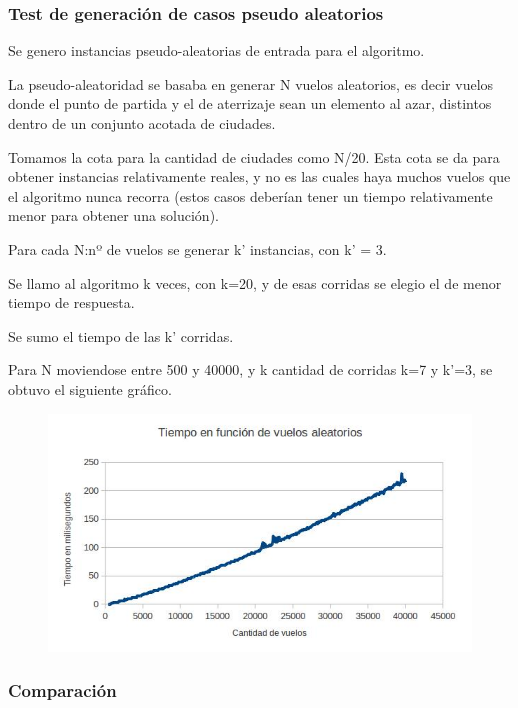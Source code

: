\subsubsection{Test de generaci\'on de casos pseudo aleatorios}

Se genero instancias pseudo-aleatorias de entrada para el algoritmo.

La pseudo-aleatoridad se basaba en generar N vuelos aleatorios, es decir vuelos donde el punto de partida y el de aterrizaje sean un elemento al azar, distintos dentro de un conjunto acotada de ciudades.

Tomamos la cota para la cantidad de ciudades como N/20. Esta cota se da para obtener instancias relativamente reales, y no es las cuales haya muchos vuelos que el algoritmo nunca recorra (estos casos deber\'ian tener un tiempo relativamente menor para obtener una soluci\'on).

Para cada N:nº de vuelos se generar k' instancias, con k' = 3.

Se llamo al algoritmo k veces, con k=20, y de esas corridas se elegio el de menor tiempo de respuesta.

Se sumo el tiempo de las k' corridas.

Para N moviendose entre 500 y 40000, y k cantidad de corridas k=7 y k'=3, se obtuvo el siguiente gr\'afico.

\begin{figure}[ht]
	\begin{minipage}[t]{\linewidth}
		\centering
		\includegraphics[width=\textwidth]{TiempoEnFuncionDeVuelosAleatorios.jpg}
	\end{minipage}	
\end{figure}




\newpage

\subsubsection{Comparaci\'on}

